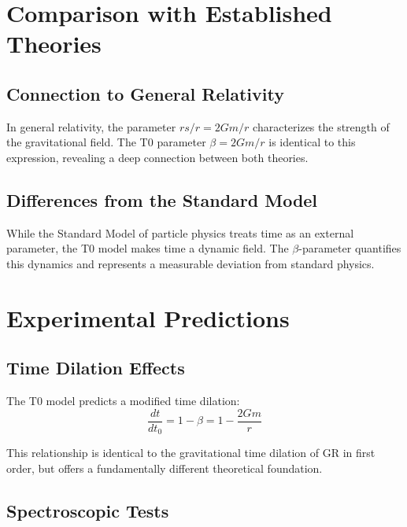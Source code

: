 \documentclass[12pt,a4paper]{article}
\begin{document}
	\section{Comparison with Established Theories}
	\label{sec:theory_comparison}
	
	\subsection{Connection to General Relativity}
	\label{subsec:gr_connection}
	
	In general relativity, the parameter $rs/r = 2Gm/r$ characterizes the strength of the gravitational field. The T0 parameter $\beta = 2Gm/r$ is identical to this expression, revealing a deep connection between both theories.
	
	\subsection{Differences from the Standard Model}
	\label{subsec:sm_differences}
	
	While the Standard Model of particle physics treats time as an external parameter, the T0 model makes time a dynamic field. The $\beta$-parameter quantifies this dynamics and represents a measurable deviation from standard physics.
	
	\section{Experimental Predictions}
	\label{sec:experimental_predictions}
	
	\subsection{Time Dilation Effects}
	\label{subsec:time_dilation}
	
	The T0 model predicts a modified time dilation:
	\begin{equation}
		\frac{dt}{dt_0} = 1 - \beta = 1 - \frac{2Gm}{r}
	\end{equation}
	
	This relationship is identical to the gravitational time dilation of GR in first order, but offers a fundamentally different theoretical foundation.
	
	\subsection{Spectroscopic Tests}
	\label{subsec:spectroscopic_tests}
	
\end{document}
